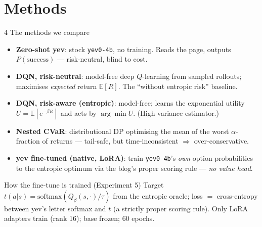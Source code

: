 \documentclass[aspectratio=169,11pt]{beamer}
\newcommand{\E}{\mathbb{E}}
\begin{document}
\section{Methods}
\begin{frame}{4 \quad The methods we compare}
  \begin{itemize}
    \item \textbf{Zero-shot yev}: stock \texttt{yev0-4b}, no training. Reads the page, outputs
          $P(\text{success})$ --- risk-neutral, blind to cost.
    \item \textbf{DQN, risk-neutral}: model-free deep $Q$-learning from sampled rollouts;
          maximises \emph{expected} return $\E[R]$. The ``without entropic risk'' baseline.
    \item \textbf{DQN, risk-aware (entropic)}: model-free; learns the exponential utility
          $U=\E[e^{-\beta R}]$ and acts by $\arg\min U$. (High-variance estimator.)
    \item \textbf{Nested CVaR}: distributional DP optimising the mean of the worst
          $\alpha$-fraction of returns --- tail-safe, but time-inconsistent $\Rightarrow$ over-conservative.
    \item \textbf{yev fine-tuned (native, LoRA)}: train \texttt{yev0-4b}'s \emph{own} option
          probabilities to the entropic optimum via the blog's proper scoring rule --- \emph{no value head}.
  \end{itemize}
  \begin{block}{How the fine-tune is trained (Experiment 5)}
  \footnotesize
  Target $t(a|s)=\mathrm{softmax}(Q_\beta(s,\cdot)/\tau)$ from the entropic oracle;
  loss $=$ cross-entropy between yev's letter softmax and $t$ (a strictly proper scoring
  rule). Only LoRA adapters train (rank 16); base frozen; 60 epochs.
  \end{block}
\end{frame}

\end{document}
